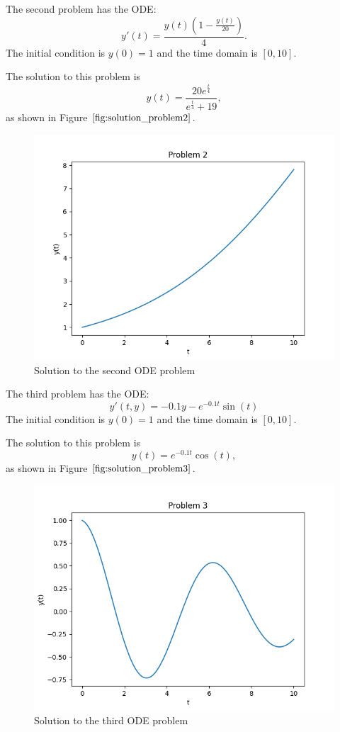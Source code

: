 The second problem has the ODE:
\begin{equation}
y'(t) = \frac{y(t)(1 - \frac{y(t)}{20})}{4}.
\end{equation}
The initial condition is $y(0) = 1$ and the time domain is $[0, 10]$.

The solution to this problem is
\begin{equation}
y(t) = \frac{20e^{\frac{t}{4}}}{e^{\frac{t}{4}} + 19},
\end{equation}
as shown in Figure $\ref{fig:solution_problem2}$.

\begin{figure}[H]
\centering
\includegraphics[width=0.7\linewidth]{./figures/solution_problem2}
\caption{Solution to the second ODE problem}
\label{fig:solution_problem2}
\end{figure}

The third problem has the ODE:
\begin{equation}
y'(t, y) = -0.1y - e^{-0.1t}\sin(t)
\end{equation}
The initial condition is $y(0) = 1$ and the time domain is $[0, 10]$.

The solution to this problem is 
\begin{equation}
y(t) = e^{-0.1t}\cos(t),
\end{equation}
as shown in Figure $\ref{fig:solution_problem3}$.

\begin{figure}[H]
\centering
\includegraphics[width=0.7\linewidth]{./figures/solution_problem3}
\caption{Solution to the third ODE problem}
\label{fig:solution_problem3}
\end{figure}

